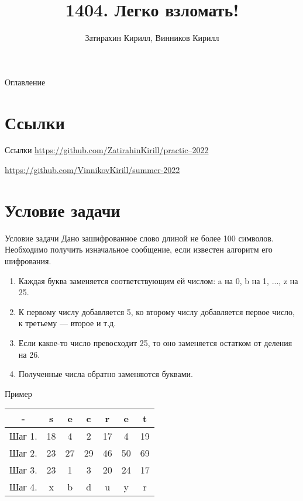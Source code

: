 \documentclass[12pt]{beamer}
\title{1404. Легко взломать!}
\author{Затирахин Кирилл, Винников Кирилл}
\begin{document}
\maketitle

\begin{frame}{Оглавление}
    \tableofcontents
\end{frame}

\section{Ссылки}

\begin{frame}{Ссылки}
     \href{https://github.com/ZatirahinKirill/practic--2022}{https://github.com/ZatirahinKirill/practic--2022}

     \href{https://github.com/VinnikovKirill/summer-2022}{https://github.com/VinnikovKirill/summer-2022}
\end{frame}

\section{Условие задачи}

\begin{frame}{Условие задачи}
    Дано зашифрованное слово длиной не более 100 символов. Необходимо получить изначальное сообщение, если известен алгоритм его шифрования.
    \begin{enumerate}
        \item<2-> Каждая буква заменяется соответствующим ей числом: a на 0, b на 1, ..., z на 25.
        \item<3-> К первому числу добавляется 5, ко второму числу добавляется первое число, к третьему — второе и т.д. 
        \item<4-> Если какое-то число превосходит 25, то оно заменяется остатком от деления на 26. 
        \item<5-> Полученные числа обратно заменяются буквами.
    \end{enumerate}
\end{frame}

\begin{frame}{Пример}

\setlength{}
\renewcommand*{\arraystretch}{2}

    \begin{table}
    \centering
    \begin{tabular}{|c|c|c|c|c|c|c|}
        \hline
        - & s & e & c & r & e & t\\
        \hline
        Шаг 1. & 18 & 4 & 2 & 17 & 4 & 19\\
        Шаг 2. & 23 & 27 & 29 & 46 & 50 & 69\\
        Шаг 3. & 23 & 1 & 3 & 20 & 24 & 17\\
        Шаг 4. & x & b & d & u & y & r\\
        \hline
    \end{tabular}
    \end{table}
    
\end{frame}
\end{document}
